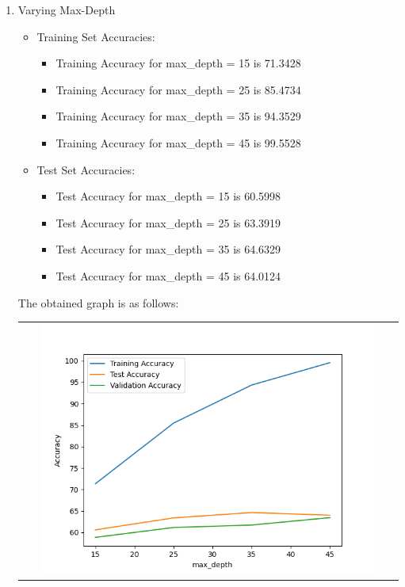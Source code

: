 \begin{enumerate}[label=(\alph*)]
\begin{enumerate}[label=\roman*.]
    \item Varying Max-Depth
    \begin{itemize}
        \item Training Set Accuracies:
        \begin{itemize}
            \item Training Accuracy for max\_depth = 15 is 71.3428
            \item Training Accuracy for max\_depth = 25 is 85.4734
            \item Training Accuracy for max\_depth = 35 is 94.3529
            \item Training Accuracy for max\_depth = 45 is 99.5528
        \end{itemize}
        \item Test Set Accuracies:
        \begin{itemize}
            \item Test Accuracy for max\_depth = 15 is 60.5998
            \item Test Accuracy for max\_depth = 25 is 63.3919
            \item Test Accuracy for max\_depth = 35 is 64.6329
            \item Test Accuracy for max\_depth = 45 is 64.0124
        \end{itemize}
    \end{itemize}
    \newpage
     The obtained graph is as follows:
     \begin{center}
        \begin{tabular}{c}
            \includegraphics[width=0.9\textwidth]{../Q1/Graphs/d_max_depth.png}

\end{tabular}
\end{center}
\end{enumerate}
\end{enumerate}
